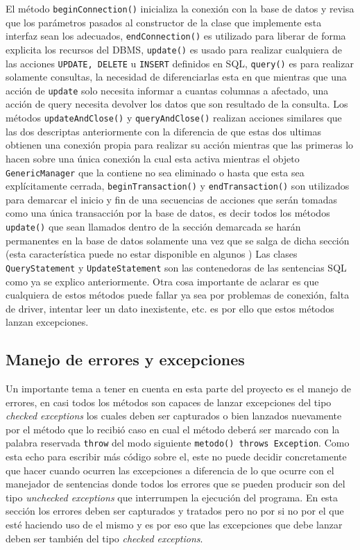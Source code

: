 El método \verb=beginConnection()= inicializa la conexión con la base de datos y revisa que los parámetros pasados al constructor de la clase que implemente esta interfaz sean los adecuados, \verb=endConnection()= es utilizado para liberar de forma explicita los recursos del DBMS, \verb=update()= es usado para realizar cualquiera de las acciones \verb=UPDATE, DELETE= u \verb=INSERT= definidos en SQL, \verb=query()= es para realizar solamente consultas, la necesidad de diferenciarlas esta en que mientras que una acción de \verb=update= solo necesita informar a cuantas columnas a afectado, una acción de query necesita devolver los datos que son resultado de la consulta. Los métodos \verb=updateAndClose()= y \verb=queryAndClose()= realizan acciones similares que las dos descriptas anteriormente con la diferencia de que estas dos ultimas obtienen una conexión propia para realizar su acción mientras que las primeras lo hacen sobre una única conexión la cual esta activa mientras el objeto \verb=GenericManager= que la contiene no sea eliminado o hasta que esta sea explícitamente cerrada, \verb=beginTransaction()= y \verb=endTransaction()= son utilizados para demarcar el inicio y fin de una secuencias de acciones que serán tomadas como una única transacción por la base de datos, es decir todos los métodos \verb=update()= que sean llamados dentro de la sección demarcada se harán permanentes en la base de datos solamente una vez que se salga de dicha sección (esta característica puede no estar disponible en algunos \dd) Las clases \verb=QueryStatement= y \verb=UpdateStatement= son las contenedoras de las sentencias SQL como ya se explico anteriormente. Otra cosa importante de aclarar es que cualquiera de estos métodos puede fallar ya sea por problemas de conexión, falta de driver, intentar leer un dato inexistente, etc. es por ello que estos métodos lanzan excepciones. 
%
\subsection{Manejo de errores y excepciones}
Un importante tema a tener en cuenta en esta parte del proyecto es el manejo de errores, en \jd casi todos los métodos son capaces de lanzar excepciones del tipo \textit{checked exceptions} los cuales deben ser capturados o bien lanzados nuevamente por el método que lo recibió caso en cual el método deberá ser marcado con la palabra reservada \verb=throw= del modo siguiente \verb=metodo() throws Exception=. Como \jj esta echo para escribir más código sobre el, este no puede decidir concretamente que hacer cuando ocurren las excepciones a diferencia de lo que ocurre con el manejador de sentencias donde todos los errores que se pueden producir son del tipo \textit{unchecked exceptions} que interrumpen la ejecución del programa. En esta sección los errores deben ser capturados y tratados pero no por \jj si no por el que esté haciendo uso de el mismo y es por eso que las excepciones que debe lanzar \jj deben ser también del tipo \textit{checked exceptions}.

